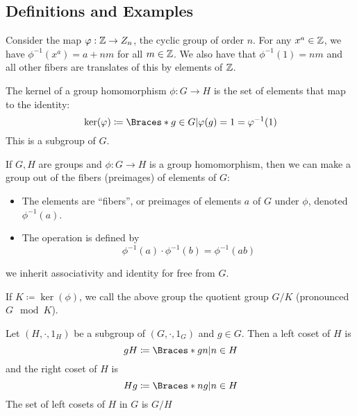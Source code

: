 \documentclass[a5paper]{article}
\begin{document}
\subsection{Definitions and Examples}
Consider the map $\varphi:\mathbb{Z}\to Z_n$, the cyclic group of order $n$. For any
$x^a\in\mathbb{Z}$, we have $\phi^{-1}(x^a)=a+nm$ for all $m\in\mathbb{Z}$. We also have that
$\phi^{-1}(1)=nm$ and all other fibers are translates of this by elements of
$\mathbb{Z}$.

\begin{definition}
	The kernel of a group homomorphism $\phi:G\to H$ is the set of elements that
  map to the identity:
  \begin{equation*}
    \operatorname{ker}(\phi)\coloneqq\braces{g\in G|\phi(g)=1} = \phi^{-1}(1)
  \end{equation*}
  This is a subgroup of $G$.
\end{definition}

\begin{definition}
	If $G,H$ are groups and $\phi:G\to H$ is a group homomorphism, then we can
  make a group out of the fibers (preimages) of elements of $G$:
  \begin{itemize}
    \item The elements are ``fibers'', or preimages of elements $a$ of $G$ under
      $\phi$, denoted $\phi^{-1}(a)$.
    \item The operation is defined by
      \begin{equation*}
        \phi^{-1}(a)\cdot \phi^{-1}(b)=\phi^{-1}(ab)
      \end{equation*}
  \end{itemize}
  we inherit associativity and identity for free from $G$.

	If $K\coloneqq \operatorname{ker}(\phi)$, we call the above group the quotient
  group $G/K$ (pronounced $G\mod K$).
\end{definition}

\begin{definition}
	Let $(H,\cdot,1_H)$ be a subgroup of $(G,\cdot,1_G)$ and $g\in G$. Then a left
  coset of $H$ is
  \begin{equation*}
    gH\coloneqq\braces{gn|n\in H}
  \end{equation*}
  and the right coset of $H$ is
  \begin{equation*}
    Hg\coloneqq\braces{ng|n\in H}
  \end{equation*}
  The set of left cosets of $H$ in $G$ is $G/H$
\end{definition}
\end{document}
